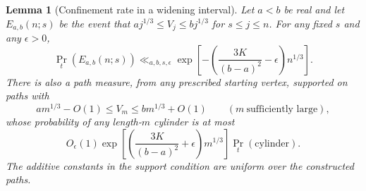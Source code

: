 \documentclass[11pt]{article}
\newtheorem{lemma}[theorem]{Lemma}
\theoremstyle{definition}
\theoremstyle{remark}
\begin{document}
\begin{lemma}[Confinement rate in a widening interval]
\label{lem:sharp-moving-strip}
Let $a<b$ be real and let
$E_{a,b}(n;s)$ be the event that
$a j^{1/3}\le V_j\le b j^{1/3}$ for $s\le j\le n$.
For any fixed $s$ and any $\epsilon>0$,
\[
 \Pr_t(E_{a,b}(n;s))
 \ll_{a,b,s,\epsilon}
 \exp\left[-\left(\frac{3K}{(b-a)^2}-\epsilon\right)n^{1/3}\right].
\]
There is also a path measure, from any prescribed starting
vertex, supported on paths with
\[
 a m^{1/3}-O(1)\le V_m\le b m^{1/3}+O(1)
 \qquad(m\ \text{sufficiently large}),
\]
whose probability of any length-$m$ cylinder is at most
\[
 O_\epsilon(1)\exp\left[
   \left(\frac{3K}{(b-a)^2}+\epsilon\right)m^{1/3}\right]
                  \Pr_t(\text{cylinder}).
\]
The additive constants in the support condition are uniform over
the constructed paths.
\end{lemma}
\end{document}
